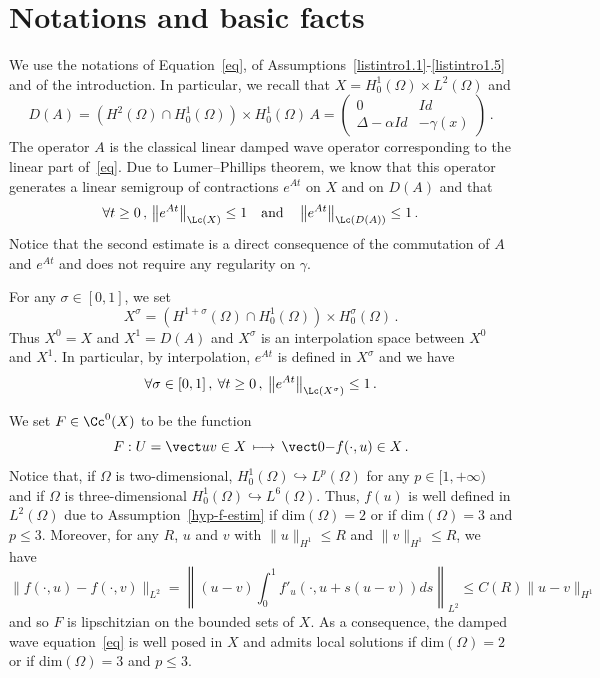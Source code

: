 \section{Notations and basic facts}\label{section-basic}
We use the notations of Equation~\eqref{eq}, of Assumptions~\eqref{listintro1.1}-\eqref{listintro1.5} and of the introduction. In particular, we recall that $X=H^1_0(\Omega)\times L^2(\Omega)$ and
\[
D(A)=\left(H^2(\Omega)\cap H^1_0(\Omega)\right)\times H^1_0(\Omega)\,
A =
\begin{pmatrix}
0 & Id \\ \Delta-\alpha Id & -\gamma(x)
\end{pmatrix}\,.
\]
The operator $A$ is the classical linear damped wave operator corresponding to the linear part of~\eqref{eq}. Due to Lumer--Phillips theorem, we know that this operator generates a linear semigroup of contractions $e^{At}$ on $X$ and on $D(A)$ and that
\[
\forall t\geq 0\,,\,\left\|e^{At}\right\|_{\Lc(X)}\leq 1\quad\text{and}\quad\left\|e^{At}\right\|_{\Lc(D(A))}\leq 1\,.
\]
Notice that the second estimate is a direct consequence of the commutation of $A$ and $e^{At}$ and does not require any regularity on $\gamma$.

For any $\sigma\in [0,1]$, we set
\[
X^\sigma=\left(H^{1+\sigma}(\Omega)\cap H^1_0(\Omega)\right)\times
H^\sigma_0(\Omega)\,.
\]
Thus $X^0=X$ and $X^1=D(A)$ and $X^\sigma$ is an interpolation space between $X^0$ and $X^1$. In particular, by interpolation, $e^{At}$ is defined in $X^\sigma$ and we have
\begin{equation}\label{eq-bound-semigroup}
\forall \sigma\in [0,1]\,,\:\forall t\geq 0\,,\:
\left\|e^{At}\right\|_{\Lc(X^\sigma)}\leq 1\,.
\end{equation}

We set $F\in\Cc^0(X)$ to be the function
\begin{equation}\label{def-F}
F:U=\vect uv \in X\,\longmapsto\,\vect 0 {-f(\cdot,u)} \in X\,.
\end{equation}
Notice that, if $\Omega$ is two-dimensional, $H^1_0(\Omega) \hookrightarrow L^{p}(\Omega)$ for any $p\in[1,+\infty)$ and if $\Omega$ is three-dimensional $H^1_0(\Omega) \hookrightarrow L^6(\Omega)$. Thus, $f(u)$ is well defined in $L^2(\Omega)$ due to Assumption~\eqref{hyp-f-estim} if dim$(\Omega)=2$ or if dim$(\Omega)=3$ and $p\leq 3$. Moreover, for any $R$, $u$ and $v$ with $\|u\|_{H^1}\leq R$ and $\|v\|_{H^1}\leq R$, we have
\[
\|f(\cdot,u)-f(\cdot,v)\|_{L^2}=\left\|(u-v)\int_0^1
f'_u(\cdot,u+s(u-v))ds\right\|_{L^2}
\leq C(R)\|u-v\|_{H^1}
\]
and so $F$ is lipschitzian on the bounded sets of $X$. As a consequence, the damped wave equation~\eqref{eq} is well posed in $X$ and admits local solutions if dim$(\Omega)=2$ or if dim$(\Omega)=3$ and $p\leq 3$.

